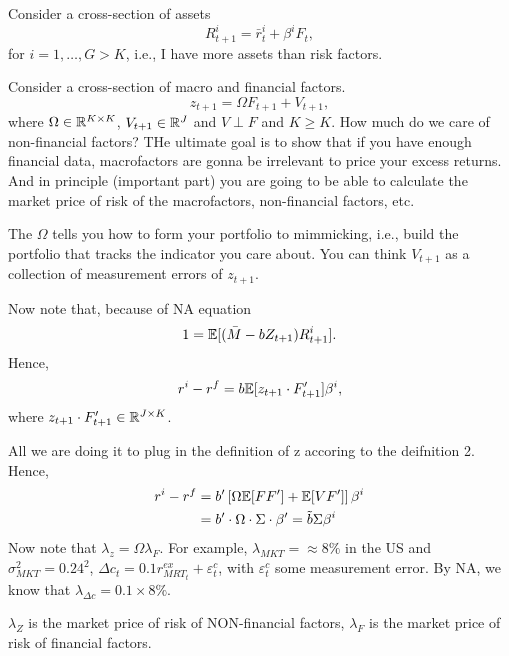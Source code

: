 Consider a cross-section of assets
$$
	R_{t+1}^i = \bar{r}_t^i + \beta^i F_t,
$$
for $i=1,\ldots, G> K$, i.e., I have more assets than risk factors. 

Consider a cross-section of macro and financial factors.
$$
	z_{t+1} = \Omega F_{t+1} + V_{t+1},
$$
where $\Omega\in\mathbb{R}^{K\times K}$, $V_{t+1}\in\mathbb{R}^J$ and $V\perp F$ and $K\geq K$. How much do we care of non-financial factors? THe ultimate goal is to show that if you have enough financial data, macrofactors are gonna be irrelevant to price your excess returns. And in principle (important part) you are going to be able to calculate the market price of risk of the macrofactors, non-financial factors, etc.

The $\Omega$ tells you how to form your portfolio to mimmicking, i.e., build the portfolio that tracks the indicator you care about. You can think $V_{t+1}$ as a collection of measurement errors of $z_{t+1}$.

Now note that, because of NA equation
$$
	1 =\mathbb{E}[(\bar{M} - b Z_{t+1})R_{t+1}^i].
$$
Hence,
$$
	r^i - r^f = b \mathbb{E}[z_{t+1}\cdot F_{t+1}']\beta^i,
$$
where $z_{t+1}\cdot F_{t+1}'\in\mathbb{R}^{J\times K}$.

All we are doing it to plug in the definition of z accoring to the deifnition 2. Hence,
$$
	\begin{aligned}
		r^i - r^f &= b' \left[\Omega \mathbb{E}[FF'] + \mathbb{E}[V F']\right]\beta^i \\
					&= b'\cdot\Omega\cdot\Sigma\cdot\beta' = \tilde{b}\Sigma\beta^{i}
	\end{aligned}
$$
Now note that $\lambda_z =\Omega\lambda_F$. For example, $\lambda_{MKT} = \approx 8\%$ in the US and $\sigma_{MKT}^2 = 0.24^2$, $\Delta c_t = 0.1 r^{ex}_{MRT_t} + \varepsilon_t^c$, with $\varepsilon_t^c$ some measurement error. By NA, we know that $\lambda_{\Delta c} = 0.1\times 8\%$.

\note $\lambda_Z$ is the market price of risk of NON-financial factors, $\lambda_F$ is the market price of risk of financial factors.